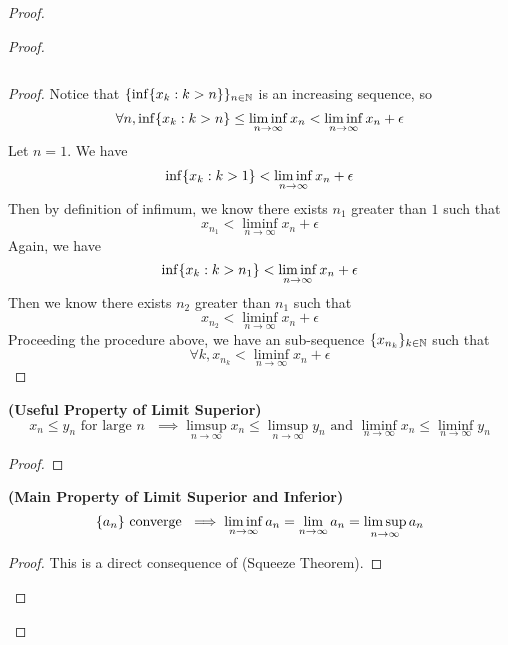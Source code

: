 \documentclass{report}
\begin{document}
\begin{proof}
\begin{proof}
\begin{theorem}
\begin{equation}
\end{equation}
\end{theorem}
\begin{proof}
Notice that $\{ \inf \{ x_k:k>n \} \}_{n\in\mathbb{N}}$ is an increasing sequence, so
\begin{equation}
\forall n, \inf \{ x_k:k>n \}\leq \liminf_{n\to\infty} x_n<\liminf_{n\to\infty} x_n+\epsilon 
\end{equation}
Let $n=1$. We have
 \begin{equation}
\inf \{ x_k:k>1 \}<\liminf_{n\to\infty}  x_n+\epsilon 
\end{equation}
Then by definition of infimum, we know there exists $n_1$ greater than  $1$ such that
 \begin{equation}
x_{n_1}<\liminf_{n\to\infty} x_n+\epsilon 
\end{equation}
Again, we have
\begin{equation}
\inf \{ x_{k}:k>n_1 \}<\liminf_{n\to\infty} x_n+\epsilon 
\end{equation}
Then we know there exists $n_2$ greater than  $n_1$ such that
 \begin{equation}
x_{n_2}<\liminf_{n\to\infty} x_n+\epsilon 
\end{equation}
Proceeding the procedure above, we have an sub-sequence $\{ x_{n_k} \}_{k\in\mathbb{N}}$ such that
\begin{equation}
\forall k, x_{n_k}<\liminf_{n\to\infty} x_n+\epsilon 
\end{equation}
\end{proof}
\begin{corollary}
\label{4.3.4}
\textbf{(Useful Property of Limit Superior)} 
\begin{equation}
x_n\leq  y_n\text{ for large $n$ }\implies \limsup_{n\to\infty} x_n\leq \limsup_{n\to\infty} y_n\text{ and }\liminf_{n\to\infty}  x_n\leq \liminf_{n\to\infty} y_n
\end{equation}
\end{corollary}
\begin{proof}

\end{proof}
\begin{theorem}
\label{4.3.5}
\textbf{(Main Property of Limit Superior and Inferior)} 
\begin{equation}
\{ a_n \}\text{ converge }\implies \liminf_{n\to\infty} a_n=\lim_{n\to\infty}a_n=\limsup_{n\to\infty} a_n
\end{equation}
\end{theorem}
\begin{proof}
This is a direct consequence of  (Squeeze Theorem). 
\end{proof}
\fbox{\begin{minipage}{39em}


\end{minipage}}
\end{proof}
\end{proof}
\end{document}

